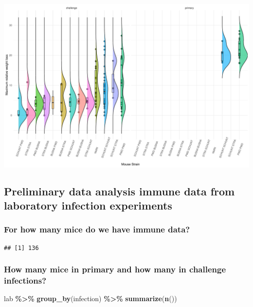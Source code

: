 \documentclass[
]{article}
\newenvironment{Shaded}{\begin{snugshade}}{\end{snugshade}}
\newcommand{\FunctionTok}[1]{\textcolor[rgb]{0.13,0.29,0.53}{\textbf{#1}}}
\newcommand{\NormalTok}[1]{#1}
\newcommand{\SpecialCharTok}[1]{\textcolor[rgb]{0.81,0.36,0.00}{\textbf{#1}}}
\begin{document}
\includegraphics{Explorative_Stats_experimental_planning_files/figure-latex/mouse_strain_WL_chal_prim-1.pdf}

\subsection{Preliminary data analysis immune data from laboratory
infection
experiments}\label{preliminary-data-analysis-immune-data-from-laboratory-infection-experiments}

\subsubsection{For how many mice do we have immune
data?}\label{for-how-many-mice-do-we-have-immune-data}

\begin{Shaded}
\end{Shaded}

\begin{verbatim}
## [1] 136
\end{verbatim}

\subsubsection{How many mice in primary and how many in challenge
infections?}\label{how-many-mice-in-primary-and-how-many-in-challenge-infections}

\begin{Shaded}
\begin{Highlighting}[]
\NormalTok{lab }\SpecialCharTok{\%\textgreater{}\%}
    \FunctionTok{group\_by}\NormalTok{(infection) }\SpecialCharTok{\%\textgreater{}\%}
    \FunctionTok{summarize}\NormalTok{(}\FunctionTok{n}\NormalTok{())}
\end{Highlighting}
\end{Shaded}
\end{document}

